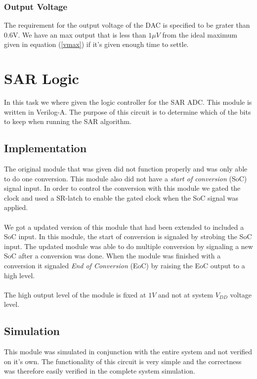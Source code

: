 \documentclass[english, 12pt, a4paper]{ifimaster}
\begin{document}
\subsubsection{Output Voltage}
The requirement for the output voltage of the DAC is specified to be grater than 0.6V. 
We have an max output that is less than \(1\mu V\) from the ideal maximum given in equation (\ref{vmax}) if it's given enough time to settle.





\section{SAR Logic}
In this task we where given the logic controller for the SAR ADC. This module is written in Verilog-A. 
The purpose of this circuit is to determine which of the bits to keep when running the SAR algorithm.

\subsection{Implementation}
The original module that was given did not function properly and was only able to do one conversion. This module also did not have a \textit{start of conversion} (SoC) signal input.
In order to control the conversion with this module we gated the clock and used a SR-latch to enable the gated clock when the SoC signal was applied.\\
\\
We got a updated version of this module that had been extended to included a SoC input. In this module, the start of conversion is signaled by strobing the SoC input.
The updated module was able to do multiple conversion by signaling a new SoC after a conversion was done. 
When the module was finished with a conversion it signaled \textit{End of Conversion} (EoC) by raising the EoC output to a high level. \\
\\
The high output level of the module is fixed at \(1 V\) and not at system \(V_{DD}\) voltage level.
\subsection{Simulation}
This module was simulated in conjunction with the entire system and not verified on it's own. 
The functionality of this circuit is very simple and the correctness was therefore easily verified in the complete system simulation.
\end{document}
